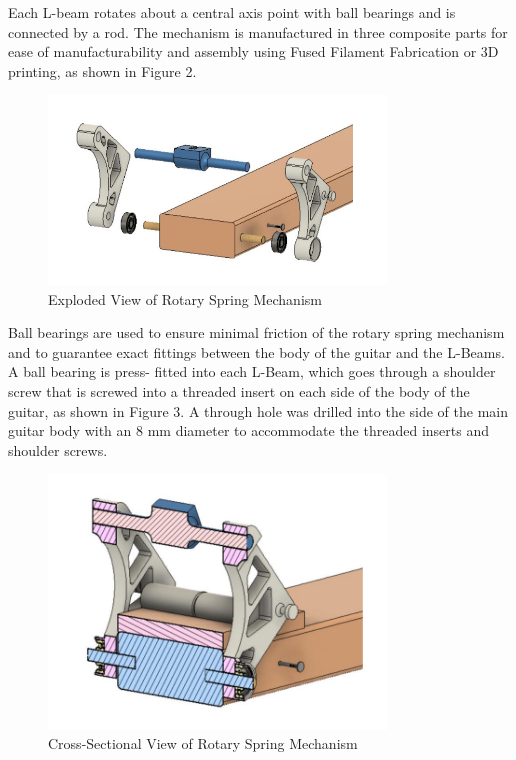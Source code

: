 \documentclass[12pt]{article}
\theoremstyle{definition} %
\theoremstyle{plain} %
\begin{document}
Each L-beam rotates about a central axis point with ball bearings and is connected by a rod.
The mechanism is manufactured in three composite parts for ease of manufacturability and
assembly using Fused Filament Fabrication or 3D printing, as shown in Figure 2.

\begin{figure}[htbp]
  \centering
  \includegraphics[width=0.8\textwidth]{fgs/fig2.png}
  \caption{Exploded View of Rotary Spring Mechanism}
  \label{fig:}
\end{figure}

Ball bearings are used to ensure minimal friction of the rotary spring mechanism and to
guarantee exact fittings between the body of the guitar and the L-Beams. A ball bearing is press-
fitted into each L-Beam, which goes through a shoulder screw that is screwed into a threaded insert
on each side of the body of the guitar, as shown in Figure 3. A through hole was drilled into the
side of the main guitar body with an 8 mm diameter to accommodate the threaded inserts and
shoulder screws.

\begin{figure}[htbp]
  \centering
  \includegraphics[width=0.8\textwidth]{fgs/fig3.png}
  \caption{Cross-Sectional View of Rotary Spring Mechanism}
  \label{fig:}
\end{figure}
\end{document}
